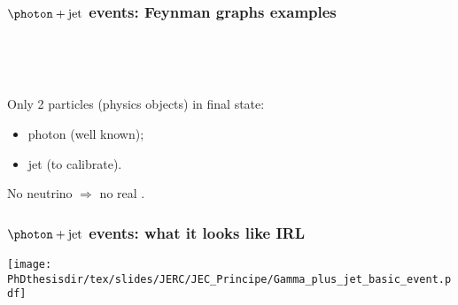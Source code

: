 \begin{frame}
\frametitle{$\photon+\text{jet}$ events: Feynman graphs examples}
~\hfill

\hfill\hfill\hfill

\hfill\hfill\hfill

\hfill~

\pause
\vfill

\manip Only 2 \og particles \fg{} (physics objects) in final state:
\begin{itemize}
\item photon (well known);
\item jet (to calibrate).
\end{itemize}
\manip No neutrino $\Rightarrow$ no real \MET.
\end{frame}

\begin{frame}
\frametitle{$\photon+\text{jet}$ events: what it looks like IRL}
\begin{center}
\texttt{[image: \\PhDthesisdir/tex/slides/JERC/JEC\_Principe/Gamma\_plus\_jet\_basic\_event.pdf]}
\end{center}
\end{frame}